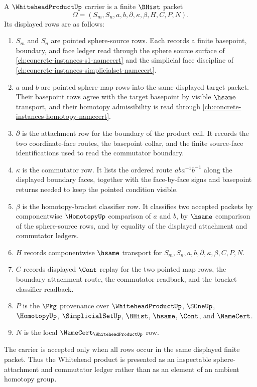 \begin{definition}
\label{def:whitehead-product-carrier}
A $\WhiteheadProductUp$ carrier is a finite $\BHist$ packet
$$
\Omega=(S_m,S_n,a,b,\partial,\kappa,\beta,H,C,P,N).
$$
Its displayed rows are as follows:
\begin{enumerate}
\item $S_m$ and $S_n$ are pointed sphere-source rows. Each records a finite basepoint, boundary, and face ledger read through the sphere source surface of \autoref{ch:concrete-instances-s1-namecert} and the simplicial face discipline of \autoref{ch:concrete-instances-simplicialset-namecert}.
\item $a$ and $b$ are pointed sphere-map rows into the same displayed target packet. Their basepoint rows agree with the target basepoint by visible $\hsame$ transport, and their homotopy admissibility is read through \autoref{ch:concrete-instances-homotopy-namecert}.
\item $\partial$ is the attachment row for the boundary of the product cell. It records the two coordinate-face routes, the basepoint collar, and the finite source-face identifications used to read the commutator boundary.
\item $\kappa$ is the commutator row. It lists the ordered route $a b a^{-1} b^{-1}$ along the displayed boundary faces, together with the face-by-face signs and basepoint returns needed to keep the pointed condition visible.
\item $\beta$ is the homotopy-bracket classifier row. It classifies two accepted packets by componentwise $\HomotopyUp$ comparison of $a$ and $b$, by $\hsame$ comparison of the sphere-source rows, and by equality of the displayed attachment and commutator ledgers.
\item $H$ records componentwise $\hsame$ transport for $S_m,S_n,a,b,\partial,\kappa,\beta,C,P,N$.
\item $C$ records displayed $\Cont$ replay for the two pointed map rows, the boundary attachment route, the commutator readback, and the bracket classifier readback.
\item $P$ is the $\Pkg$ provenance over $\WhiteheadProductUp$, $\SOneUp$, $\HomotopyUp$, $\SimplicialSetUp$, $\BHist$, $\hsame$, $\Cont$, and $\NameCert$.
\item $N$ is the local $\NameCert_{\WhiteheadProductUp}$ row.
\end{enumerate}
The carrier is accepted only when all rows occur in the same displayed finite packet. Thus the Whitehead product is presented as an inspectable sphere-attachment and commutator ledger rather than as an element of an ambient homotopy group.
\end{definition}

